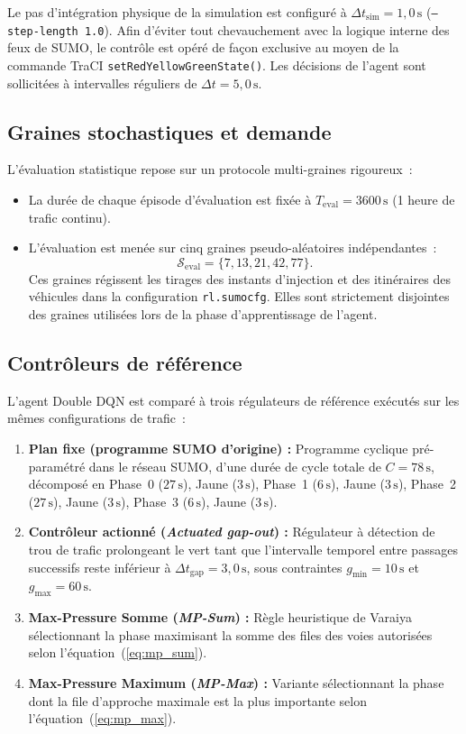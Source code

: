 \documentclass[11pt,a4paper]{article}
\begin{document}
Le pas d'intégration physique de la simulation est configuré à $\Delta t_{\text{sim}} = 1{,}0\,\mathrm{s}$ (\texttt{--step-length 1.0}). Afin d'éviter tout chevauchement avec la logique interne des feux de SUMO, le contrôle est opéré de façon exclusive au moyen de la commande TraCI \texttt{setRedYellowGreenState()}. Les décisions de l'agent sont sollicitées à intervalles réguliers de $\Delta t = 5{,}0\,\mathrm{s}$.

\subsection{Graines stochastiques et demande}
L'évaluation statistique repose sur un protocole multi-graines rigoureux~:
\begin{itemize}[nosep]
    \item La durée de chaque épisode d'évaluation est fixée à $T_{\text{eval}} = 3600\,\mathrm{s}$ (1 heure de trafic continu).
    \item L'évaluation est menée sur cinq graines pseudo-aléatoires indépendantes~:
    \begin{equation}
    \mathcal{S}_{\text{eval}} = \{7, 13, 21, 42, 77\}.
    \end{equation}
    Ces graines régissent les tirages des instants d'injection et des itinéraires des véhicules dans la configuration \texttt{rl.sumocfg}. Elles sont strictement disjointes des graines utilisées lors de la phase d'apprentissage de l'agent.
\end{itemize}

\subsection{Contrôleurs de référence}
L'agent Double DQN est comparé à trois régulateurs de référence exécutés sur les mêmes configurations de trafic~:
\begin{enumerate}[nosep]
    \item \textbf{Plan fixe (programme SUMO d'origine) : } Programme cyclique pré-paramétré dans le réseau SUMO, d'une durée de cycle totale de $C = 78\,\mathrm{s}$, décomposé en Phase~0 ($27\,\mathrm{s}$), Jaune ($3\,\mathrm{s}$), Phase~1 ($6\,\mathrm{s}$), Jaune ($3\,\mathrm{s}$), Phase~2 ($27\,\mathrm{s}$), Jaune ($3\,\mathrm{s}$), Phase~3 ($6\,\mathrm{s}$), Jaune ($3\,\mathrm{s}$).
    \item \textbf{Contrôleur actionné (\emph{Actuated gap-out}) : } Régulateur à détection de trou de trafic prolongeant le vert tant que l'intervalle temporel entre passages successifs reste inférieur à $\Delta t_{\text{gap}} = 3{,}0\,\mathrm{s}$, sous contraintes $g_{\min} = 10\,\mathrm{s}$ et $g_{\max} = 60\,\mathrm{s}$.
    \item \textbf{Max-Pressure Somme (\emph{MP-Sum}) : } Règle heuristique de Varaiya sélectionnant la phase maximisant la somme des files des voies autorisées selon l'équation~(\ref{eq:mp_sum}).
    \item \textbf{Max-Pressure Maximum (\emph{MP-Max}) : } Variante sélectionnant la phase dont la file d'approche maximale est la plus importante selon l'équation~(\ref{eq:mp_max}).
\end{enumerate}
\end{document}
